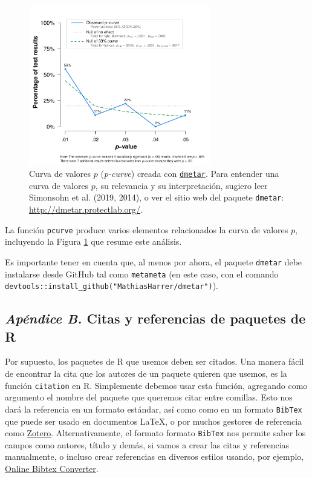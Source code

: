 \documentclass[
  bookmarksnumbered]{article}
\begin{document}
\begin{figure}

{\centering \includegraphics[width=300px]{images/pcurve} 

}

\caption{Curva de valores $p$ (\textit{p-curve}) creada con \href{http://dmetar.protectlab.org/}{\texttt{dmetar}}. Para entender una curva de valores $p$, su relevancia y su interpretación, sugiero leer Simonsohn et al. (2019, 2014), o ver el sitio web del paquete \texttt{dmetar}: \href{http://dmetar.protectlab.org/}{http://dmetar.protectlab.org/}.}\label{fig:pcurve-plot}
\end{figure}

La función \texttt{pcurve} produce varios elementos relacionados la curva de valores \(p\), incluyendo la Figura \ref{fig:pcurve-plot} que resume este análisis.

Es importante tener en cuenta que, al menos por ahora, el paquete \texttt{dmetar} debe instalarse desde GitHub tal como \texttt{metameta} (en este caso, con el comando \texttt{devtools::install\_github("MathiasHarrer/dmetar")}).

\hypertarget{paquetes-cit}{%
\subsection*{\texorpdfstring{\emph{Apéndice B.} Citas y referencias de paquetes de R}{Apéndice B. Citas y referencias de paquetes de R}}\label{paquetes-cit}}

Por supuesto, los paquetes de R que usemos deben ser citados. Una manera fácil de encontrar la cita que los autores de un paquete quieren que usemos, es la función \texttt{citation} en R. Simplemente debemos usar esta función, agregando como argumento el nombre del paquete que queremos citar entre comillas. Esto nos dará la referencia en un formato estándar, así como como en un formato \texttt{BibTex} que puede ser usado en documentos \LaTeX, o por muchos gestores de referencia como \href{https://www.zotero.org/}{Zotero}. Alternativamente, el formato formato \texttt{BibTex} nos permite saber los campos como autores, título y demás, si vamos a crear las citas y referencias manualmente, o incluso crear referencias en diversos estilos usando, por ejemplo, \href{https://asouqi.github.io/bibtex-converter/}{Online Bibtex Converter}.
\end{document}
